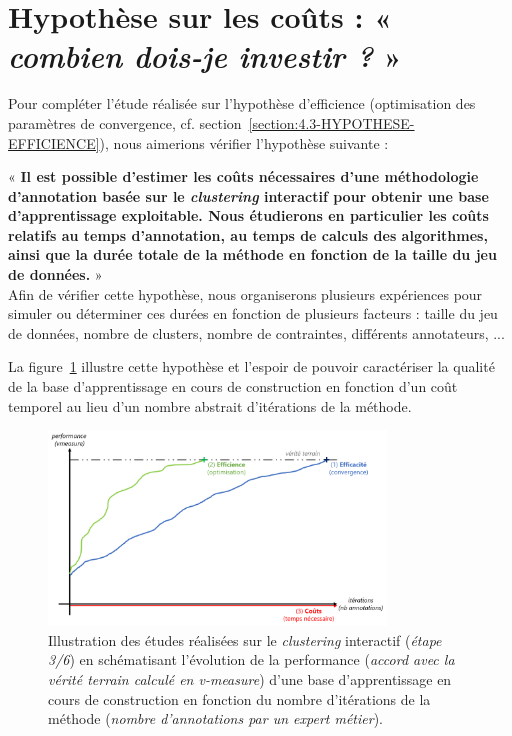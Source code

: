 \section{Hypothèse sur les coûts : « \textit{combien dois-je investir ?} »}
\label{section:4.3-HYPOTHESE-COUTS}

	Pour compléter l'étude réalisée sur l'hypothèse d'efficience (optimisation des paramètres de convergence, cf. section~\ref{section:4.3-HYPOTHESE-EFFICIENCE}), nous aimerions vérifier l'hypothèse suivante :

	\begin{tcolorbox}[
		title=\faVial~\textbf{Hypothèse sur les coûts}~\faVial,
		colback=colorTcolorboxHypothesis!15,
		colframe=colorTcolorboxHypothesis!75,
		width=\linewidth
	]
		«\textbf{
			Il est possible d'\textbf{estimer les coûts nécessaires} d'une méthodologie d'annotation basée sur le \textit{clustering} interactif pour obtenir une base d'apprentissage exploitable. Nous étudierons en particulier les coûts relatifs au temps d'annotation, au temps de calculs des algorithmes, ainsi que la durée totale de la méthode en fonction de la taille du jeu de données.
		} » \\

		Afin de vérifier cette hypothèse, nous organiserons plusieurs expériences pour simuler ou déterminer ces durées en fonction de plusieurs facteurs : taille du jeu de données, nombre de clusters, nombre de contraintes, différents annotateurs, ...
		
		La figure~\ref{figure:4.3-HYPOTHESE-COUTS} illustre cette hypothèse et l'espoir de pouvoir caractériser la qualité de la base d'apprentissage en cours de construction en fonction d'un coût temporel au lieu d'un nombre abstrait d'itérations de la méthode. 
		
		\begin{figure}[H]  %
			\centering
			\includegraphics[width=0.8\textwidth]{figures/hypotheses-03-couts}
			\caption{Illustration des études réalisées sur le \textit{clustering} interactif (\textit{étape 3/6}) en schématisant l'évolution de la performance (\textit{accord avec la vérité terrain calculé en v-measure}) d'une base d'apprentissage en cours de construction en fonction du nombre d'itérations de la méthode (\textit{nombre d'annotations par un expert métier}).}
			\label{figure:4.3-HYPOTHESE-COUTS}
		\end{figure}

	\end{tcolorbox}
	

